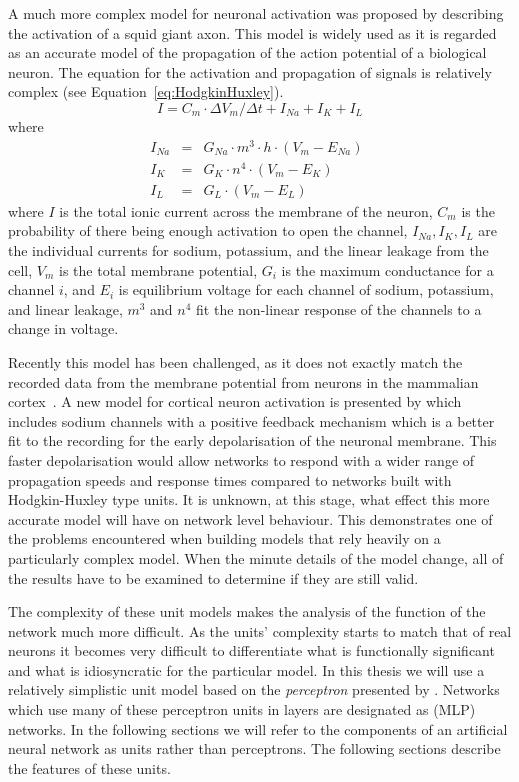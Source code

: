 A much more complex model for neuronal activation was proposed by \citet{Hodgkin1952} describing the activation of a squid giant axon.  This model is widely used as it is regarded as an accurate model of the propagation of the action potential of a biological neuron.  The equation for the activation and propagation of signals is relatively complex (see Equation~\eqref{eq:HodgkinHuxley}).  \begin{equation}
		\label{eq:HodgkinHuxley}
		I = C_m \cdot {\Delta V_{m}}/{\Delta t} + I_{Na} + I_{K} + I_{L}
\end{equation}
where
\begin{eqnarray*}
	I_{Na} &=& G_{Na} \cdot m^{3} \cdot h \cdot (V_{m}-E_{Na})\ \ \\
	I_{K}  &=& G_{K} \cdot n^{4} \cdot (V_{m}-E_{K})\\
	I_{L}  &=& G_{L} \cdot (V_{m}-E_{L})
\end{eqnarray*}
where 
$I$ is the total ionic current across the membrane of the neuron, 
$C_m$ is the probability of there being enough activation to open the channel, 
$I_{Na}, I_{K}, I_{L}$ are the individual currents for sodium, potassium, and the linear leakage from the cell, 
$V_m$ is the total membrane potential, 
$G_i$ is the maximum conductance for a channel $i$, and
$E_i$ is equilibrium voltage for each channel of sodium, potassium, and linear leakage,
$m^3$ and $n^4$ fit the non-linear response of the channels to a change in voltage.


Recently this model has been challenged, as it does not exactly match the recorded data from the membrane potential from neurons in the mammalian cortex~\citep{Naundorf06}.  A new model for cortical neuron activation is presented by \citet{Naundorf06} which includes sodium channels with a positive feedback mechanism which is a better fit to the recording for the early depolarisation of the neuronal membrane.  This faster depolarisation would allow networks to respond with a wider range of propagation speeds and response times compared to networks built with Hodgkin-Huxley type units.  It is unknown, at this stage, what effect this more accurate model will have on network level behaviour.  This demonstrates one of the problems encountered when building models that rely heavily on a particularly complex model.  When the minute details of the model change, all of the results have to be examined to determine if they are still valid.


The complexity of these unit models makes the analysis of the function of the network much more difficult.  As the units' complexity starts to match that of real neurons it becomes very difficult to differentiate what is functionally significant and what is idiosyncratic for the particular model.  In this thesis we will use a relatively simplistic unit model based on the \emph{perceptron} presented by \citet{Rosenblatt1958}.  Networks which use many of these perceptron units in layers are designated as  (MLP) networks. In the following sections we will refer to the components of an artificial neural network as units rather than perceptrons.  The following sections describe the features of these units.

